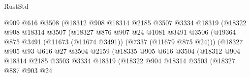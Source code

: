 \begin{lexlean}{RustStd}
\begin{coremodule}
                                    @909
                                    @616
                                    @3508
                                    (@18312
                                      @908
                                      @18314
                                      @2185
                                      @3507
                                      @3334
                                      @18319
                                      (@18322
                                        @908
                                        @18314
                                        @3507
                                        (@18327
                                          @876
                                          @907
                                          @24
                                          @1081
                                          @3491
                                          @3506
                                          (@19364
                                            @875
                                            @3491
                                            (@11673 (@11674 @3491))
                                            (@7337 (@11679 @875 @24)))
                                          (@18327
                                            @905
                                            @93
                                            @616
                                            @27
                                            @3504
                                            @2159
                                            (@18335
                                              @905
                                              @616
                                              @3504
                                              (@18312
                                                @904
                                                @18314
                                                @2185
                                                @3503
                                                @3334
                                                @18319
                                                (@18322
                                                  @904
                                                  @18314
                                                  @3503
                                                  (@18327
                                                    @887
                                                    @903
                                                    @24

\end{coremodule}
\end{lexlean}
